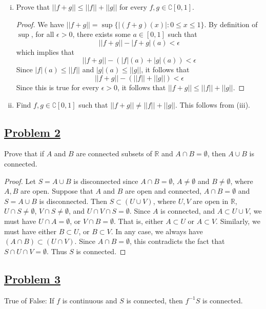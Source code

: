 \documentclass[10pt,letterpaper]{article}
\begin{document}
\begin{enumerate}[(i)]
		\item Prove that $||f + g|| \leq ||f|| + ||g||$ for every $f, g \in \complement[0, 1]$.
		\begin{proof}
			We have $||f + g|| = \sup\{|(f + g)(x)| : 0 \leq x \leq 1 \}$. By definition of $\sup$, 
			for all $\epsilon > 0$, there exists some $a \in [0, 1]$ such that
			$$||f + g|| - |f + g|(a) < \epsilon$$
			which implies that
			$$||f + g|| - (|f|(a) + |g|(a)) < \epsilon$$
			Since $|f|(a) \leq ||f||$ and $|g|(a) \leq ||g||$, it follows that
			$$||f + g|| - (||f|| + ||g||) < \epsilon$$
			Since this is true for every $\epsilon > 0$, it follows that
			$||f + g|| \leq ||f|| + ||g||$.
		\end{proof}				
		
		\item Find $f, g \in \complement[0, 1]$ such that $||f + g|| \neq ||f|| + ||g||$.
		This follows from (iii).
	\end{enumerate}
	
	\subsection*{{\color{purple}\underline{Problem 2}}}
	Prove that if $A$ and $B$ are connected subsets of $\mathbb{R}$ and $A \cap B = \emptyset$, then
	$A \cup B$ is connected.
	\begin{proof}
		Let $S = A \cup B$ is disconnected since $A \cap B = \emptyset$, $A \neq \emptyset$ and $B \neq \emptyset$,
		where $A, B$ are open. Suppose that $A$ and $B$ are open and connected, $A \cap B = \emptyset$ and 
		$S = A \cup B$ is disconnected. Then $S \subset (U \cup V)$, where $U, V$ are open in $\mathbb{R}$, 
		$U \cap S \neq \emptyset$, $V \cap S \neq \emptyset$, and $U \cap V \cap S = \emptyset$. Since $A$ is connected,
		and $A \subset U \cup V$, we must have $U \cap A = \emptyset$, or $V \cap B = \emptyset$. That is, either
		$A \subset U$ or $A \subset V$. Similarly, we must have either $B \subset U$, or $B \subset V$. In any case,
		we always have $(A \cap B) \subset (U \cap V)$. Since $A \cap B = \emptyset$, this contradicts the fact that
		$S \cap U \cap V = \emptyset$. Thus $S$ is connected.
	\end{proof}
	
	\subsection*{{\color{purple}\underline{Problem 3}}}
	True of False: If $f$ is continuous and $S$ is connected, then $f^{-1}S$ is connected.
	
\end{document}
